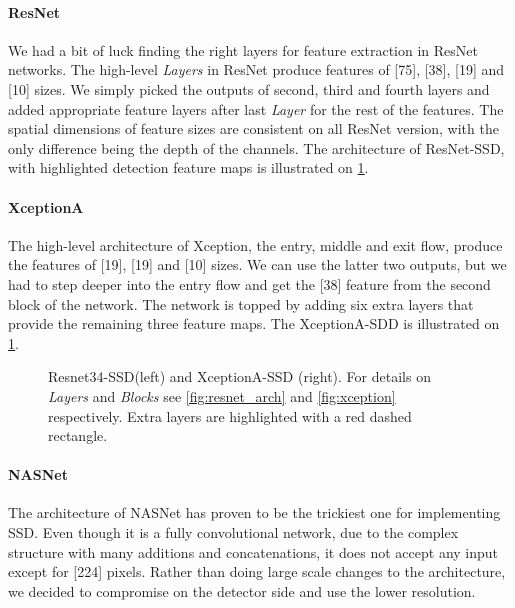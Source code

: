 \paragraph{ResNet} We had a bit of luck finding the right layers for feature extraction in ResNet networks. The high-level \textit{Layers} in ResNet produce features of [75], [38], [19] and [10] sizes. We simply picked the outputs of second, third and fourth layers and added appropriate feature layers after last \textit{Layer} for the rest of the features. The spatial dimensions of feature sizes are consistent on all ResNet version, with the only difference being the depth of the channels. The architecture of ResNet-SSD, with highlighted detection feature maps is illustrated on \cref{fig:resnet_xception_SSD}.

\paragraph{XceptionA} The high-level architecture of Xception, the entry, middle and exit flow, produce the features of [19], [19] and [10] sizes. We can use the latter two outputs, but we had to step deeper into the entry flow and get the [38] feature from the second block of the network. The network is topped by adding six extra layers that provide the remaining three feature maps. The XceptionA-SDD is illustrated on \cref{fig:resnet_xception_SSD}.


\begin{figure}
    \centering
    \resnetSSD
    \caption[Resnet34-SSD and Xception-SSD]%
    {Resnet34-SSD(left) and XceptionA-SSD (right). For details on \textit{Layers} and \textit{Blocks} see \cref{fig:resnet_arch} and \cref{fig:xception} respectively. Extra layers are highlighted with a red dashed rectangle.}

    \label{fig:resnet_xception_SSD}
\end{figure}

\paragraph{NASNet} The architecture of NASNet has proven to be the trickiest one for implementing SSD. Even though it is a fully convolutional network, due to the complex structure with many additions and concatenations, it does not accept any input except for [224] pixels. Rather than doing large scale changes to the architecture, we decided to compromise on the detector side and use the lower resolution. 

